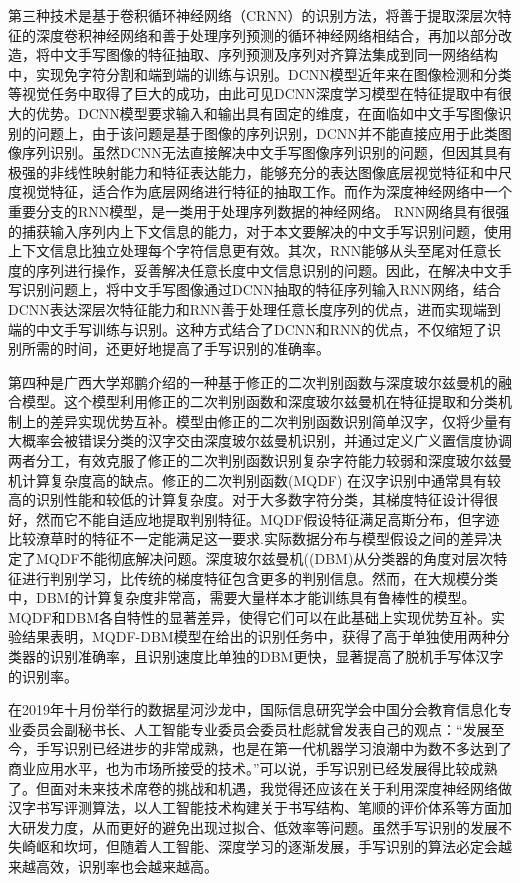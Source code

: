 \documentclass{article}
\begin{document}
第三种技术是基于卷积循环神经网络（CRNN）的识别方法\citep{shixin,}，将善于提取深层次特征的深度卷积神经网络和善于处理序列预测的循环神经网络相结合，再加以部分改造，将中文手写图像的特征抽取、序列预测及序列对齐算法集成到同一网络结构中，实现免字符分割和端到端的训练与识别。DCNN模型近年来在图像检测和分类等视觉任务中取得了巨大的成功，由此可见DCNN深度学习模型在特征提取中有很大的优势。DCNN模型要求输入和输出具有固定的维度，在面临如中文手写图像识别的问题上，由于该问题是基于图像的序列识别，DCNN并不能直接应用于此类图像序列识别。虽然DCNN无法直接解决中文手写图像序列识别的问题，但因其具有极强的非线性映射能力和特征表达能力，能够充分的表达图像底层视觉特征和中尺度视觉特征，适合作为底层网络进行特征的抽取工作。而作为深度神经网络中一个重要分支的RNN模型，是一类用于处理序列数据的神经网络。 RNN网络具有很强的捕获输入序列内上下文信息的能力，对于本文要解决的中文手写识别问题，使用上下文信息比独立处理每个字符信息更有效。其次，RNN能够从头至尾对任意长度的序列进行操作，妥善解决任意长度中文信息识别的问题。因此，在解决中文手写识别问题上，将中文手写图像通过DCNN抽取的特征序列输入RNN网络，结合DCNN表达深层次特征能力和RNN善于处理任意长度序列的优点，进而实现端到端的中文手写训练与识别。这种方式结合了DCNN和RNN的优点，不仅缩短了识别所需的时间，还更好地提高了手写识别的准确率。


第四种是广西大学郑鹏介绍的一种基于修正的二次判别函数与深度玻尔兹曼机的融合模型\citep{zhengpeng,}。这个模型利用修正的二次判别函数和深度玻尔兹曼机在特征提取和分类机制上的差异实现优势互补。模型由修正的二次判别函数识别简单汉字，仅将少量有大概率会被错误分类的汉字交由深度玻尔兹曼机识别，并通过定义广义置信度协调两者分工，有效克服了修正的二次判别函数识别复杂字符能力较弱和深度玻尔兹曼机计算复杂度高的缺点。修正的二次判别函数(MQDF) 在汉字识别中通常具有较高的识别性能和较低的计算复杂度。对于大多数字符分类，其梯度特征设计得很好，然而它不能自适应地提取判别特征。MQDF假设特征满足高斯分布，但字迹比较潦草时的特征不一定能满足这一要求.实际数据分布与模型假设之间的差异决定了MQDF不能彻底解决问题。深度玻尔兹曼机((DBM)从分类器的角度对层次特征进行判别学习，比传统的梯度特征包含更多的判别信息。然而，在大规模分类中，DBM的计算复杂度非常高，需要大量样本才能训练具有鲁棒性的模型。MQDF和DBM各自特性的显著差异，使得它们可以在此基础上实现优势互补。实验结果表明，MQDF-DBM模型在给出的识别任务中，获得了高于单独使用两种分类器的识别准确率，且识别速度比单独的DBM更快，显著提高了脱机手写体汉字的识别率。


在2019年十月份举行的数据星河沙龙中，国际信息研究学会中国分会教育信息化专业委员会副秘书长、人工智能专业委员会委员杜彪就曾发表自己的观点：“发展至今，手写识别已经进步的非常成熟，也是在第一代机器学习浪潮中为数不多达到了商业应用水平，也为市场所接受的技术。”可以说，手写识别已经发展得比较成熟了。但面对未来技术席卷的挑战和机遇，我觉得还应该在关于利用深度神经网络做汉字书写评测算法，以人工智能技术构建关于书写结构、笔顺的评价体系等方面加大研发力度，从而更好的避免出现过拟合、低效率等问题。虽然手写识别的发展不失崎岖和坎坷，但随着人工智能、深度学习的逐渐发展，手写识别的算法必定会越来越高效，识别率也会越来越高。
\par
\end{document}
